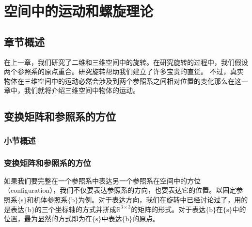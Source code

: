 \documentclass[12pt, a4paper, article, UTF8]{ctexart}
\begin{document}
\section{空间中的运动和螺旋理论}
\subsection{章节概述}
在上一章，我们研究了二维和三维空间中的旋转。在研究旋转的过程中，我们假设两个参照系的原点重合。研究旋转帮助我们建立了许多宝贵的直觉。
不过，真实物体在三维空间中的运动必然会涉及到两个参照系之间相对位置的变化那么在这一章中，我们就将介绍三维空间中物体的运动。




\subsection{变换矩阵和参照系的方位}
\subsubsection{小节概述}
\subsubsection{变换矩阵和参照系的方位}
如果我们要完整在一个参照系中表达另一个参照系在空间中的方位（configuration），我们不仅要表达参照系的方向，也要表达它的位置。以固定参照系$\{\text{s}\}$和机体参照系$\{\text{b}\}$为例。对于表达方向，我们在旋转中已经讨论过了，用的是表达$\{\text{b}\}$的三个坐标轴的方式并拼成$\mathbb{R}^{3\times3}$的矩阵的形式。对于表达$\{\text{b}\}$在$\{\text{s}\}$中的位置，最为显然的方式即为在$\{\text{s}\}$中表达$\{\text{b}\}$的原点。
\end{document}
